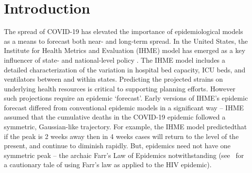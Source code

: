 \section{Introduction}
The spread of COVID-19 has elevated the importance of epidemiological
models as a means to forecast both near- and long-term spread. 
In the United States, the Institute for Health Metrics and Evaluation (IHME)
model has emerged as a key influencer of state- and national-level
policy \citep{covid2020forecasting}.  
The IHME model includes a detailed characterization
of the variation in
hospital bed capacity, ICU beds, and ventilators between and within
states. Predicting the projected strains on underlying
health resources is critical to supporting planning efforts.
However such projections require
an epidemic `forecast'.  Early versions of IHME's epidemic forecast
differed from conventional
epidemic models in a significant way -- IHME assumed
that the cumulative deaths in the COVID-19 epidemic 
followed a symmetric, Gaussian-like trajectory. 
For example, the 
IHME model predictedthat if the peak is 2 weeks away then in 4 weeks
cases will return to the level of the present, and continue
to diminish rapidly.  But, epidemics need not have one symmetric peak -- 
the archaic Farr's Law of Epidemics notwithstanding
(see~\citep{bregman1990farr} for a cautionary tale of using
Farr's law as applied to the HIV epidemic). 
